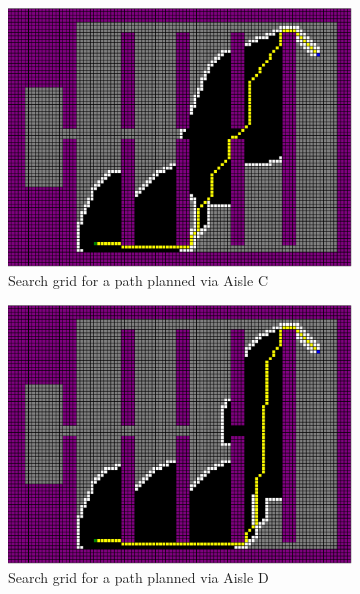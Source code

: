 \documentclass[a4paper,12pt]{article}
\begin{document}
\begin{figure}[htp]
\begin{subfigure}{.45\textwidth}
				\centering
				\includegraphics[width=\textwidth]{../exports/initial_search_grid_aisleC}
				\caption{Search grid for a path planned via Aisle C}
				\label{fig:searchGridAisleC}
			\end{subfigure}
			\begin{subfigure}{.45\textwidth}
				\centering
				\includegraphics[width=\textwidth]{../exports/initial_search_grid_aisleD}
				\caption{Search grid for a path planned via Aisle D}
				\label{fig:searchGridAisleD}
			\end{subfigure}
			\begin{subfigure}{.45\textwidth}
				\centering

\end{subfigure}
\end{figure}
\end{document}
